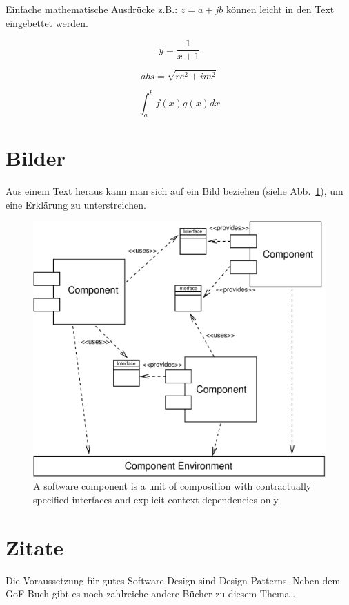 \begin{appendix}
Einfache mathematische Ausdrücke z.B.: $z=a+jb$ können leicht in den
Text eingebettet werden.

\begin{displaymath}
y=\frac{1}{x+1}
\end{displaymath}


\begin{displaymath}
abs = \sqrt{re^2 + im^2}
\end{displaymath}

\begin{displaymath}
\int_{a}^{b} f(x)g(x)dx
\end{displaymath}

\newpage


\section{Bilder}

Aus einem Text heraus kann man sich auf ein Bild beziehen (siehe
Abb.~\ref{ComponentDef}), um eine Erklärung zu unterstreichen.

\begin{figure}[htbp]
    \centering
    \includegraphics [width=12cm,angle=0] {figures/Environment}
    \caption{A software component is a unit of composition with 
        contractually specified interfaces and explicit context 
		dependencies only.}
    \label{ComponentDef}
\end{figure}


\section{Zitate}

Die Voraussetzung für gutes Software Design sind Design Patterns.
Neben dem GoF Buch \cite[S. 190]{Gamma95} gibt es noch zahlreiche andere Bücher
zu diesem Thema \cite[S. 999]{Marinescu02} \cite{dpquiz} \cite{Wick2005}.

\end{appendix}
